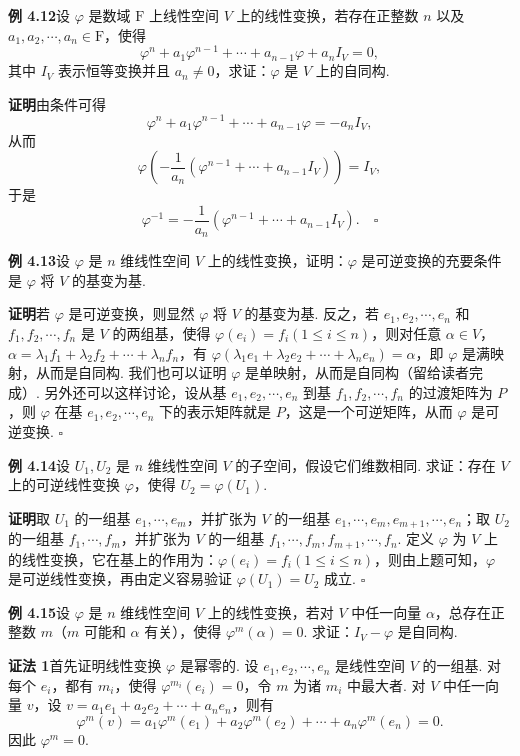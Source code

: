 \documentclass[UTF8, 12pt, fontset=fandol, oneside]{ctexart}
\begin{document}
\noindent\textbf{例 4.12}\quad 设 $\varphi$ 是数域 $\mathrm{F}$ 上线性空间 $V$ 上的线性变换，若存在正整数 $n$ 以及 $a_1,a_2,\cdots,a_n\in\mathrm{F}$，使得
\[
\varphi^n+a_1\varphi^{n-1}+\cdots+a_{n-1}\varphi+a_nI_V=0,
\]
其中 $I_V$ 表示恒等变换并且 $a_n\ne0$，求证：$\varphi$ 是 $V$ 上的自同构.

\noindent\textbf{证明}\quad 由条件可得
\[
\varphi^n+a_1\varphi^{n-1}+\cdots+a_{n-1}\varphi=-a_nI_V,
\]
从而
\[
\varphi\left(-\frac1{a_n}(\varphi^{n-1}+\cdots+a_{n-1}I_V)\right)=I_V,
\]
于是
\[
\varphi^{-1}=-\frac1{a_n}(\varphi^{n-1}+\cdots+a_{n-1}I_V). \quad \square
\]

\noindent\textbf{例 4.13}\quad 设 $\varphi$ 是 $n$ 维线性空间 $V$ 上的线性变换，证明：$\varphi$ 是可逆变换的充要条件是 $\varphi$ 将 $V$ 的基变为基.

\noindent\textbf{证明}\quad 若 $\varphi$ 是可逆变换，则显然 $\varphi$ 将 $V$ 的基变为基. 反之，若 $e_1,e_2,\cdots,e_n$ 和 $f_1,f_2,\cdots,f_n$ 是 $V$ 的两组基，使得 $\varphi(e_i)=f_i(1\le i\le n)$，则对任意 $\alpha\in V$，$\alpha=\lambda_1f_1+\lambda_2f_2+\cdots+\lambda_nf_n$，有 $\varphi(\lambda_1e_1+\lambda_2e_2+\cdots+\lambda_ne_n)=\alpha$，即 $\varphi$ 是满映射，从而是自同构. 我们也可以证明 $\varphi$ 是单映射，从而是自同构（留给读者完成）. 另外还可以这样讨论，设从基 $e_1,e_2,\cdots,e_n$ 到基 $f_1,f_2,\cdots,f_n$ 的过渡矩阵为 $P$，则 $\varphi$ 在基 $e_1,e_2,\cdots,e_n$ 下的表示矩阵就是 $P$，这是一个可逆矩阵，从而 $\varphi$ 是可逆变换. $\square$

\noindent\textbf{例 4.14}\quad 设 $U_1,U_2$ 是 $n$ 维线性空间 $V$ 的子空间，假设它们维数相同. 求证：存在 $V$ 上的可逆线性变换 $\varphi$，使得 $U_2=\varphi(U_1)$.

\noindent\textbf{证明}\quad 取 $U_1$ 的一组基 $e_1,\cdots,e_m$，并扩张为 $V$ 的一组基 $e_1,\cdots,e_m,e_{m+1},\cdots,e_n$；取 $U_2$ 的一组基 $f_1,\cdots,f_m$，并扩张为 $V$ 的一组基 $f_1,\cdots,f_m,f_{m+1},\cdots,f_n$. 定义 $\varphi$ 为 $V$ 上的线性变换，它在基上的作用为：$\varphi(e_i)=f_i(1\le i\le n)$，则由上题可知，$\varphi$ 是可逆线性变换，再由定义容易验证 $\varphi(U_1)=U_2$ 成立. $\square$

\noindent\textbf{例 4.15}\quad 设 $\varphi$ 是 $n$ 维线性空间 $V$ 上的线性变换，若对 $V$ 中任一向量 $\alpha$，总存在正整数 $m$（$m$ 可能和 $\alpha$ 有关），使得 $\varphi^m(\alpha)=0$. 求证：$I_V-\varphi$ 是自同构.

\noindent\textbf{证法 1}\quad 首先证明线性变换 $\varphi$ 是幂零的. 设 $e_1,e_2,\cdots,e_n$ 是线性空间 $V$ 的一组基. 对每个 $e_i$，都有 $m_i$，使得 $\varphi^{m_i}(e_i)=0$，令 $m$ 为诸 $m_i$ 中最大者. 对 $V$ 中任一向量 $v$，设 $v=a_1e_1+a_2e_2+\cdots+a_ne_n$，则有
\[
\varphi^m(v)=a_1\varphi^m(e_1)+a_2\varphi^m(e_2)+\cdots+a_n\varphi^m(e_n)=0.
\]
因此 $\varphi^m=0$.
\end{document}
